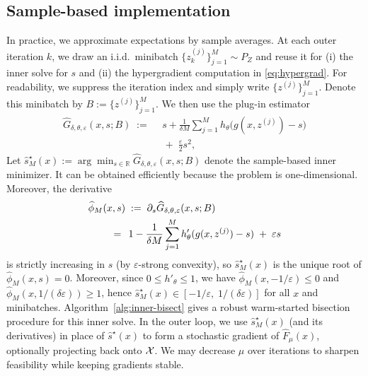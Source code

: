 \documentclass{uai2026} %
\theoremstyle{plain}
\theoremstyle{definition}
\begin{document}
\subsection{Sample-based implementation}
In practice, we approximate expectations by sample averages.
At each outer iteration $k$, we draw an i.i.d.\ minibatch $\{z_k^{(j)}\}_{j=1}^M\sim P_Z$ and reuse it for (i) the inner solve for $s$ and (ii) the hypergradient computation in \eqref{eq:hypergrad}.
For readability, we suppress the iteration index and simply write $\{z^{(j)}\}_{j=1}^M$.
Denote this minibatch by $B:=\{z^{(j)}\}_{j=1}^M$.
We then use the plug-in estimator
\begin{equation}
  \begin{aligned}
  \widehat G_{\delta,\theta,\varepsilon}(x,s;B)
  \;:=\;
  &\, s + \frac{1}{\delta M}\sum_{j=1}^M h_\theta\!\bigl(g(x,z^{(j)})-s\bigr)\\
  &\;+\; \frac{\varepsilon}{2}s^2,
  \end{aligned}\label{eq:Ghat-plugin}
\end{equation}
Let $\widehat s_M^\star(x):=\arg\min_{s\in\mathbb{R}}\widehat G_{\delta,\theta,\varepsilon}(x,s;B)$ denote the sample-based inner minimizer.
It can be obtained efficiently because the problem is one-dimensional.
Moreover, the derivative
\begin{equation}
  \begin{aligned}
  \MoveEqLeft[2]\widehat\phi_M(x,s)
  \;:=\;
  \partial_s \widehat G_{\delta,\theta,\varepsilon}(x,s;B)\\
  &\;=\;
  \,1-\frac{1}{\delta M}\sum_{j=1}^M h'_\theta(g(x,z^{(j)})-s)\;+\;\varepsilon s
  \end{aligned}\label{eq:phi-plugin}
\end{equation}
is strictly increasing in $s$ (by $\varepsilon$-strong convexity), so $\widehat s_M^\star(x)$ is the unique root of $\widehat\phi_M(x,s)=0$.
Moreover, since $0\le h'_\theta\le 1$, we have $\widehat\phi_M(x,-1/\varepsilon)\le 0$ and $\widehat\phi_M(x,1/(\delta\varepsilon))\ge 1$, hence $\widehat s_M^\star(x)\in[-1/\varepsilon,\;1/(\delta\varepsilon)]$ for all $x$ and minibatches.
Algorithm~\ref{alg:inner-bisect} gives a robust warm-started bisection procedure for this inner solve.
In the outer loop, we use $\widehat s_M^\star(x)$ (and its derivatives) in place of $\widehat s^\star(x)$ to form a stochastic gradient of $\widehat F_\mu(x)$, optionally projecting back onto $\mathcal{X}$.
We may decrease $\mu$ over iterations to sharpen feasibility while keeping gradients stable.
\end{document}
